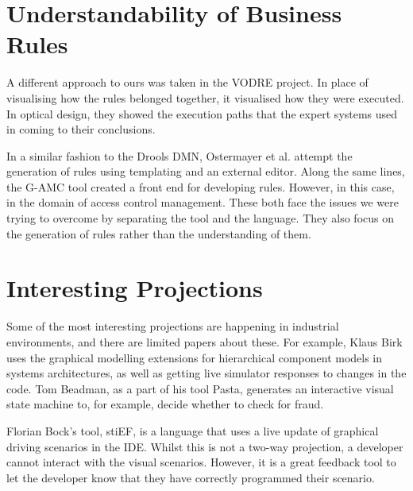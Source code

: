 \section{Understandability of Business Rules}

A different approach to ours was taken in the VODRE project\cite{lapaev2014vodre}.
In place of visualising how the rules belonged together, it visualised how they were executed.
In optical design, they showed the execution paths that the expert systems used in coming to their conclusions.

In a similar fashion to the Drools DMN, Ostermayer et al.\cite{ostermayer2013simplifying} attempt the generation of rules using templating and an external editor.
Along the same lines, the G-AMC tool\cite{sa2016g} created a front end for developing rules.
However, in this case, in the domain of access control management.
These both face the issues we were trying to overcome by separating the tool and the language. 
They also focus on the generation of rules rather than the understanding of them.

\section{Interesting Projections}
Some of the most interesting projections are happening in industrial environments, and there are limited papers about these.
For example, Klaus Birk\cite{Birken_Interactive} uses the graphical modelling extensions for hierarchical component models in systems architectures, as well as getting live simulator responses to changes in the code.
Tom Beadman\cite{Beadman_Journey}, as a part of his tool Pasta, generates an interactive visual state machine to, for example, decide whether to check for fraud. 

Florian Bock's tool, stiEF\cite{Bock_stief}, is a language that uses a live update of graphical driving scenarios in the IDE.
Whilst this is not a two-way projection, a developer cannot interact with the visual scenarios.
However, it is a great feedback tool to let the developer know that they have correctly programmed their scenario. 